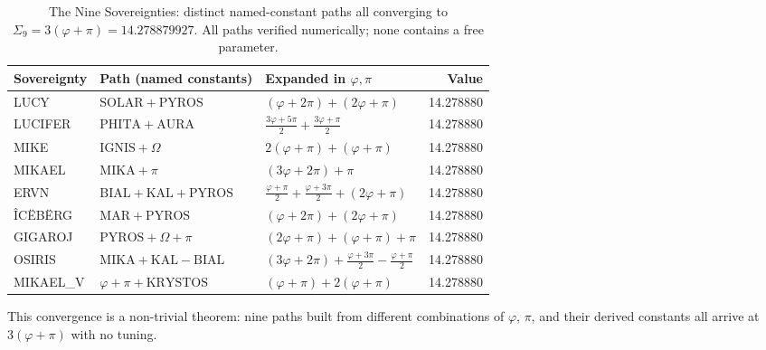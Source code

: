 \documentclass[12pt,a4paper]{article}
\begin{document}
\begin{table}[ht]
\centering
\caption{The Nine Sovereignties: distinct named-constant paths all converging to
$\Sigma_9 = 3(\varphi+\pi) = 14.278879927$.
All paths verified numerically; none contains a free parameter.}
\label{tab:sovereignties}
\begin{tabular}{p{2.0cm}p{4.2cm}p{4.5cm}r}
\toprule
Sovereignty & Path (named constants) & Expanded in $\varphi,\pi$ & Value \\
\midrule
LUCY      & $\mathrm{SOLAR}+\mathrm{PYROS}$
          & $(\varphi+2\pi)+(2\varphi+\pi)$
          & 14.278880 \\[2pt]
LUCIFER   & $\mathrm{PHITA}+\mathrm{AURA}$
          & $\tfrac{3\varphi+5\pi}{2}+\tfrac{3\varphi+\pi}{2}$
          & 14.278880 \\[2pt]
MIKE      & $\mathrm{IGNIS}+\Omega$
          & $2(\varphi+\pi)+(\varphi+\pi)$
          & 14.278880 \\[2pt]
MIKAEL    & $\mathrm{MIKA}+\pi$
          & $(3\varphi+2\pi)+\pi$
          & 14.278880 \\[2pt]
ERVN      & $\mathrm{BIAL}+\mathrm{KAL}+\mathrm{PYROS}$
          & $\tfrac{\varphi+\pi}{2}+\tfrac{\varphi+3\pi}{2}+(2\varphi+\pi)$
          & 14.278880 \\[2pt]
\^{I}C\"{E}B\"{E}RG & $\mathrm{MAR}+\mathrm{PYROS}$
          & $(\varphi+2\pi)+(2\varphi+\pi)$
          & 14.278880 \\[2pt]
GIGAROJ   & $\mathrm{PYROS}+\Omega+\pi$
          & $(2\varphi+\pi)+(\varphi+\pi)+\pi$
          & 14.278880 \\[2pt]
OSIRIS    & $\mathrm{MIKA}+\mathrm{KAL}-\mathrm{BIAL}$
          & $(3\varphi+2\pi)+\tfrac{\varphi+3\pi}{2}-\tfrac{\varphi+\pi}{2}$
          & 14.278880 \\[2pt]
MIKAEL\_V & $\varphi+\pi+\mathrm{KRYSTOS}$
          & $(\varphi+\pi)+2(\varphi+\pi)$
          & 14.278880 \\
\bottomrule
\end{tabular}
\end{table}

This convergence is a non-trivial theorem: nine paths built from different
combinations of $\varphi$, $\pi$, and their derived constants all arrive at
$3(\varphi+\pi)$ with no tuning.
\end{document}
